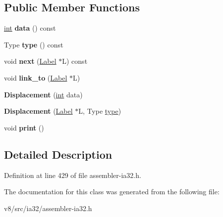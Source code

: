 \subsection*{Public Member Functions}
\begin{DoxyCompactItemize}
\item 
\mbox{\label{classv8_1_1internal_1_1Displacement_a0460109955f4cf8e46174d9491b73169}} 
\mbox{\hyperlink{classint}{int}} {\bfseries data} () const
\item 
\mbox{\label{classv8_1_1internal_1_1Displacement_a329c0a32822d960abee3a8150490d798}} 
Type {\bfseries type} () const
\item 
\mbox{\label{classv8_1_1internal_1_1Displacement_a3012ee35b27c401ffa95da3228fb4518}} 
void {\bfseries next} (\mbox{\hyperlink{classv8_1_1internal_1_1Label}{Label}} $\ast$L) const
\item 
\mbox{\label{classv8_1_1internal_1_1Displacement_a95581569c96d3705fa1f39a8be6bbd42}} 
void {\bfseries link\+\_\+to} (\mbox{\hyperlink{classv8_1_1internal_1_1Label}{Label}} $\ast$L)
\item 
\mbox{\label{classv8_1_1internal_1_1Displacement_a8aa937cbad6923551efacddc25743aeb}} 
{\bfseries Displacement} (\mbox{\hyperlink{classint}{int}} data)
\item 
\mbox{\label{classv8_1_1internal_1_1Displacement_a6a513a73fb2a623f82a921cee5b8b87a}} 
{\bfseries Displacement} (\mbox{\hyperlink{classv8_1_1internal_1_1Label}{Label}} $\ast$L, Type \mbox{\hyperlink{classstd_1_1conditional_1_1type}{type}})
\item 
\mbox{\label{classv8_1_1internal_1_1Displacement_a0520e3dfa870004fcb70edb4991a70f5}} 
void {\bfseries print} ()
\end{DoxyCompactItemize}


\subsection{Detailed Description}


Definition at line 429 of file assembler-\/ia32.\+h.



The documentation for this class was generated from the following file\+:\begin{DoxyCompactItemize}
\item 
v8/src/ia32/assembler-\/ia32.\+h\end{DoxyCompactItemize}
